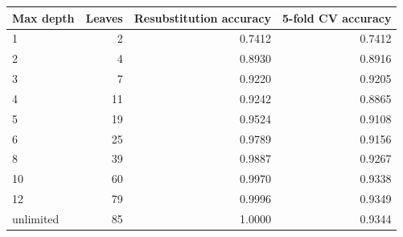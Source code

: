 \begin{tabular}{lrrr}
\toprule
Max depth & Leaves & Resubstitution accuracy & 5-fold CV accuracy \\
\midrule
1 & 2 & 0.7412 & 0.7412 \\
2 & 4 & 0.8930 & 0.8916 \\
3 & 7 & 0.9220 & 0.9205 \\
4 & 11 & 0.9242 & 0.8865 \\
5 & 19 & 0.9524 & 0.9108 \\
6 & 25 & 0.9789 & 0.9156 \\
8 & 39 & 0.9887 & 0.9267 \\
10 & 60 & 0.9970 & 0.9338 \\
12 & 79 & 0.9996 & 0.9349 \\
unlimited & 85 & 1.0000 & 0.9344 \\
\bottomrule
\end{tabular}
